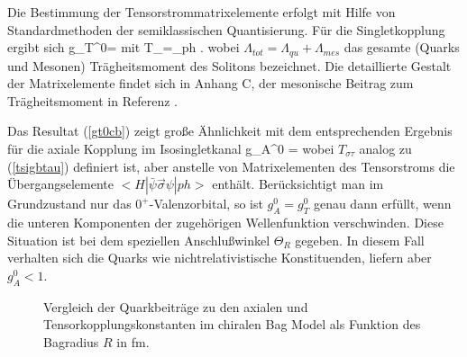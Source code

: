 Die Bestimmung der Tensorstrommatrixelemente erfolgt mit Hilfe von
Standardmethoden der semiklassischen Quantisierung. F\"ur die
Singletkopplung ergibt sich   
\be
\label{gt0cb}
g_T^{0}=
\ee
mit
\be
\label{tsigbtau}
T_{\overline{\sigma}\tau}=\sum_{ph}
.
\ee
wobei $\Lambda_{tot}=\Lambda_{qu}+\Lambda_{mes}$ das gesamte (Quarks und
Mesonen) Tr\"agheitsmoment des Solitons bezeichnet.  Die detaillierte 
Gestalt der Matrixelemente findet sich in Anhang C, der mesonische
Beitrag zum  Tr\"agheitsmoment in Referenz \cite{HTW90}.

Das Resultat (\ref{gt0cb}) zeigt gro\ss e \"Ahnlichkeit mit dem 
entsprechenden Ergebnis f\"ur die axiale Kopplung im Isosingletkanal
\be
\label{ga0cb}
 g_A^0 = 
\ee
wobei $T_{\sigma\tau}$ analog zu (\ref{tsigbtau}) definiert ist, aber
anstelle von Matrixelementen des Tensorstroms die \"Ubergangselemente
$<H|\bar{\psi}\vec{\sigma}\psi|ph>$ enth\"alt. Ber\"ucksichtigt man 
im Grundzustand nur das $0^+$-Valenzorbital, so ist $g_A^0=g_T^0$
genau dann  erf\"ullt, wenn die unteren Komponenten der zugeh\"origen
Wellenfunktion verschwinden. Diese Situation ist bei dem speziellen
Anschlu\ss winkel $\Theta_R$ gegeben. In diesem Fall verhalten sich 
die Quarks wie nichtrelativistische Konstituenden, liefern aber 
$g_A^0<1$.
\begin{figure}
\caption{Vergleich der Quarkbeitr\"age zu den axialen und 
Tensorkopplungskonstanten im chiralen Bag Model als Funktion 
des Bagradius $R$ in fm.}
\vspace{14cm}
\end{figure} 

